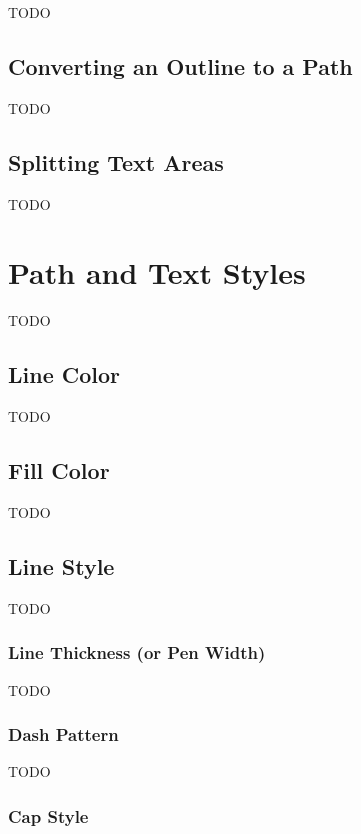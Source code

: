 TODO


\section{Converting an Outline to a Path}\label{sec:outlinetopath}

TODO


\section{Splitting Text Areas}\label{sec:splittext}

TODO


\chapter{Path and Text Styles}\label{sec:styles}

TODO


\section{Line Color}\label{sec:linepaint}

TODO


\section{Fill Color}\label{sec:fillpaint}

TODO


\section{Line Style}\label{sec:pathstyle}

TODO


\subsection{Line Thickness (or Pen Width)}\label{sec:penwidth}

TODO


\subsection{Dash Pattern}\label{sec:dashpattern}

TODO


\subsection{Cap Style}\label{sec:capstyle}

